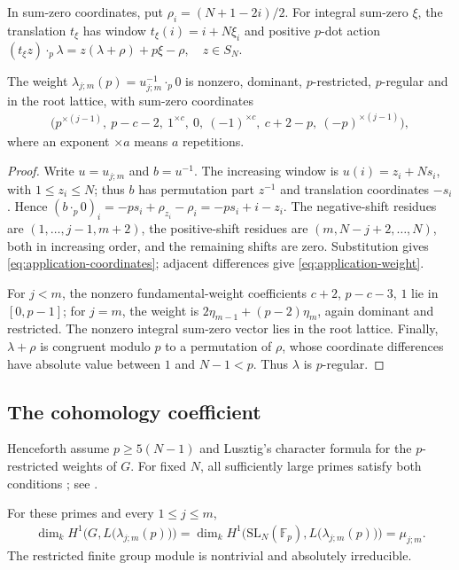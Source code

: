\documentclass[a4paper,11pt]{amsart}
\numberwithin{equation}{subsection}
\theoremstyle{plain}
\theoremstyle{definition}
\theoremstyle{remark}
\begin{document}
In sum-zero coordinates, put $\rho_i=(N+1-2i)/2$.
For integral sum-zero $\xi$, the translation $t_\xi$ has
window $t_\xi(i)=i+N\xi_i$ and positive $p$-dot action
$(t_\xi z)\mathbin{\cdot_p}\lambda
=z(\lambda+\rho)+p\xi-\rho,\quad z\in S_N$.

\begin{lemma}\label{lem:application-weight}
The weight $\lambda_{j;m}(p)=u_{j;m}^{-1}\cdot_p0$ is nonzero,
dominant, $p$-restricted, $p$-regular and in the root lattice,
with sum-zero coordinates
\begin{gather}\label{eq:application-coordinates}
\bigl(p^{\times(j-1)},\ p-c-2,\ 1^{\times c},\ 0,\
(-1)^{\times c},\ c+2-p,\ (-p)^{\times(j-1)}\bigr),
\end{gather}
where an exponent $\times a$ means $a$ repetitions.
\end{lemma}

\begin{proof}
Write $u=u_{j;m}$ and $b=u^{-1}$. The increasing window is
$u(i)=z_i+Ns_i$, with $1\le z_i\le N$; thus $b$ has permutation
part $z^{-1}$ and translation coordinates $-s_i$. Hence
$(b\cdot_p0)_i=-ps_i+\rho_{z_i}-\rho_i=-ps_i+i-z_i$.
The negative-shift residues are $(1,\ldots,j-1,m+2)$, the
positive-shift residues are $(m,N-j+2,\ldots,N)$, both in increasing
order, and the remaining shifts are zero. Substitution gives
\autoref{eq:application-coordinates}; adjacent differences give
\autoref{eq:application-weight}.

For $j<m$, the nonzero fundamental-weight coefficients
$c+2$, $p-c-3$, $1$ lie in $[0,p-1]$; for $j=m$, the weight is
$2\eta_{m-1}+(p-2)\eta_m$, again dominant and restricted.
The nonzero integral sum-zero vector lies in the root lattice.
Finally, $\lambda+\rho$ is congruent modulo $p$ to a permutation
of $\rho$, whose coordinate differences have absolute value
between $1$ and $N-1<p$. Thus $\lambda$ is $p$-regular.
\end{proof}

\subsection{The cohomology coefficient}

Henceforth assume $p\ge5(N-1)$ and Lusztig's character formula
for the $p$-restricted weights of $G$. For fixed $N$,
all sufficiently large primes satisfy both conditions \cite{AJS};
see \cite[Theorem~3.1]{Luebeck}.

\begin{lemma}\label{prop:application-transfer}
For these primes and every $1\le j\le m$,
\begin{gather*}
\dim_k H^1\Big(G,L\big(\lambda_{j;m}(p)\big)\Big)
=\dim_k H^1\Big(\mathrm{SL}_N(\mathbb F_p),L\big(\lambda_{j;m}(p)\big)\Big)
=\mu_{j;m}.
\end{gather*}
The restricted finite group module is nontrivial and absolutely
irreducible.
\end{lemma}
\end{document}
